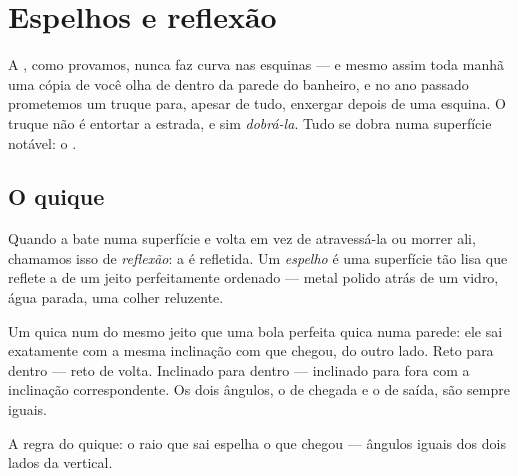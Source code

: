 \chapter{Espelhos e reflexão}\label{ch:g5:mirrors-reflection}

A , como provamos, nunca faz curva nas esquinas --- e mesmo assim
toda manhã uma cópia de você olha de dentro da parede do banheiro, e
no ano passado prometemos um truque para, apesar de tudo, enxergar
depois de uma esquina. O truque não é entortar a estrada, e sim
\emph{dobrá-la}. Tudo se dobra numa superfície notável: o .

\section{O quique}

\begin{definition}[Reflexão]\label{def:g5:mirrors-reflection:reflection}
Quando a  bate numa superfície e volta em vez de atravessá-la ou
morrer ali, chamamos isso de \emph{reflexão}: a  é
refletida. Um \emph{espelho} é uma superfície tão lisa
que reflete a  de um jeito perfeitamente ordenado --- metal polido
atrás de um vidro, água parada, uma colher reluzente.
\end{definition}

\begin{proposition}\label{prop:g5:mirrors-reflection:bounce}
Um  quica num  do mesmo jeito que uma bola perfeita
quica numa parede: ele sai exatamente com a mesma inclinação com que
chegou, do outro lado. Reto para dentro --- reto de volta. Inclinado
para dentro --- inclinado para fora com a inclinação
correspondente. Os dois ângulos, o de chegada e o de saída, são
sempre iguais.
\end{proposition}

\begin{omfigure}

{\small A regra do quique: o raio que sai espelha o que chegou ---
ângulos iguais dos dois lados da vertical.}
\end{omfigure}

